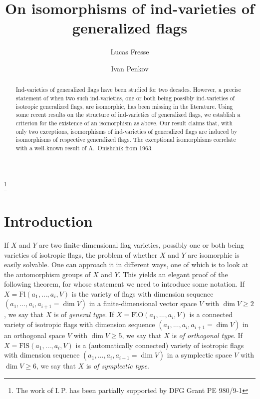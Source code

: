 \documentclass[12pt]{amsart}
\theoremstyle{definition}
\begin{document}
\title{On isomorphisms of ind-varieties of generalized flags}
\author{Lucas Fresse}
\address[L. F.]{Universit\'e de Lorraine, CNRS, Institut \'Elie Cartan de Lorraine, UMR 7502, Vandoeu\-vre-l\`es-Nancy, F-54506, France}
\author{Ivan Penkov}\thanks{The work of I.\,P. has been partially supported by DFG Grant PE 980/9-1}
\address[I. P.]{Constructor University, 28759 Bremen, Germany}

\begin{abstract}
Ind-varieties of generalized flags have been studied for two decades. However, a precise statement of when two such ind-varieties, one or both being possibly  ind-varieties of isotropic generalized flags, are isomorphic, has been missing in the literature. Using some recent results on the structure of ind-varieties of generalized flags, we establish a criterion for the existence of an isomorphism as above. Our result claims that, with only two exceptions, isomorphisms of ind-varieties of generalized flags are induced by isomorphisms of respective generalized flags. The exceptional isomorphisms correlate with a well-known result of A.~Onishchik from 1963.
\end{abstract}


\maketitle

\setcounter{tocdepth}{1}


\section{Introduction}

If $X$ and $Y$ are two finite-dimensional flag varieties, possibly one or both being varieties of isotropic flags, the problem of whether $X$ and $Y$ are isomorphic is easily solvable.
One can approach it in different ways, one of which is to look at the automorphism  groups of $X$ and $Y$. This yields an elegant proof of the following theorem, for whose statement we need to introduce some notation.
If $X=\mathrm{Fl}(a_1,\ldots,a_i,V)$ is the variety of flags with dimension sequence $(a_1,\ldots,a_i,a_{i+1}=\dim V)$ in a finite-dimensional vector space $V$ with $\dim V\geq 2$, we say that $X$ is of \emph{general type}. If $X=\mathrm{FlO}(a_1,\ldots,a_i,V)$ is a connected variety
of isotropic flags with dimension sequence $(a_1,\ldots,a_i,a_{i+1}=\dim V)$ in an  orthogonal space $V$ with $\dim V\geq 5$, we say that $X$ is \emph{of orthogonal type}. If $X=\mathrm{FlS}(a_1,\ldots,a_i,V)$ is a (automatically connected) variety of isotropic flags with dimension sequence $(a_1,\ldots,a_i,a_{i+1}=\dim V)$ in a symplectic space $V$ with $\dim V\geq 6$, we say that $X$ is \emph{of symplectic type}.
\end{document}

